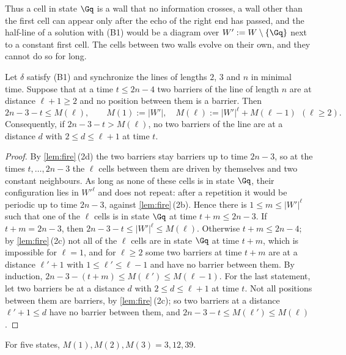 Thus a cell in state $\Gq$ is a wall that no information crosses, a wall other
than the first cell can appear only after the echo of the right end has passed,
and the half-line of a solution with (B1) would be a diagram over
$W':=W\setminus\{\Gq\}$ next to a constant first cell. The cells between two
walls evolve on their own, and they cannot do so for long.

\begin{lemma}[gaps]\label{lem:gap}
Let $\delta$ satisfy \textup{(B1)} and synchronize the lines of lengths $2$, $3$
and $n$ in minimal time. Suppose that at a time $t\le2n-4$ two barriers of the
line of length $n$ are at distance $\ell+1\ge2$ and no position between them is
a barrier. Then
\[
2n-3-t\le M(\ell),\qquad M(1):=|W'|,\quad M(\ell):=|W'|^{\ell}+M(\ell-1)\ \
(\ell\ge2).
\]
Consequently, if $2n-3-t>M(\ell)$, no two barriers of the line are at a
distance $d$ with $2\le d\le\ell+1$ at time $t$.
\end{lemma}

\begin{proof}
By \cref{lem:fire}\,(2d) the two barriers stay barriers up to time $2n-3$, so at
the times $t,\dots,2n-3$ the $\ell$ cells between them are driven by themselves
and two constant neighbours. As long as none of these cells is in state $\Gq$,
their configuration lies in $W'^{\ell}$ and does not repeat: after a repetition
it would be periodic up to time $2n-3$, against \cref{lem:fire}\,(2b). Hence
there is $1\le m\le|W'|^{\ell}$ such that one of the $\ell$ cells is in state
$\Gq$ at time $t+m\le2n-3$. If $t+m=2n-3$, then
$2n-3-t\le|W'|^{\ell}\le M(\ell)$. Otherwise $t+m\le2n-4$; by
\cref{lem:fire}\,(2c) not all of the $\ell$ cells are in state $\Gq$ at time
$t+m$, which is impossible for $\ell=1$, and for $\ell\ge2$ some two barriers at
time $t+m$ are at a distance $\ell'+1$ with $1\le\ell'\le\ell-1$ and have no
barrier between them. By induction, $2n-3-(t+m)\le M(\ell')\le M(\ell-1)$. For
the last statement, let two barriers be at a distance $d$ with
$2\le d\le\ell+1$ at time $t$. Not all positions between them are barriers, by
\cref{lem:fire}\,(2c); so two barriers at a distance $\ell'+1\le d$ have no
barrier between them, and $2n-3-t\le M(\ell')\le M(\ell)$.
\end{proof}

For five states, $M(1),M(2),M(3)=3,12,39$.


